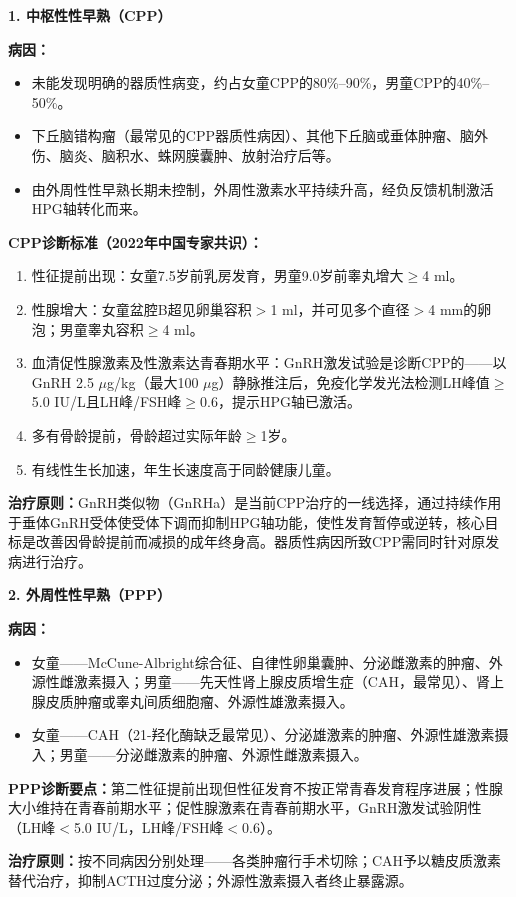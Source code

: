\begin{keybox}
\textbf{1. 中枢性性早熟（CPP）}

\textbf{病因：}
\begin{itemize}[leftmargin=*]
    \item {}未能发现明确的器质性病变，约占女童CPP的80\%--90\%，男童CPP的40\%--50\%。
    \item {}下丘脑错构瘤（最常见的CPP器质性病因）、其他下丘脑或垂体肿瘤、脑外伤、脑炎、脑积水、蛛网膜囊肿、放射治疗后等。
    \item {}由外周性性早熟长期未控制，外周性激素水平持续升高，经负反馈机制激活HPG轴转化而来。
\end{itemize}

\textbf{CPP诊断标准（2022年中国专家共识）：}
\begin{enumerate}[leftmargin=*]
    \item 性征提前出现：女童7.5岁前乳房发育，男童9.0岁前睾丸增大$\geq$4 ml。
    \item 性腺增大：女童盆腔B超见卵巢容积$>$1 ml，并可见多个直径$>$4 mm的卵泡；男童睾丸容积$\geq$4 ml。
    \item 血清促性腺激素及性激素达青春期水平：GnRH激发试验是诊断CPP的——以GnRH 2.5 $\mu$g/kg（最大100 $\mu$g）静脉推注后，免疫化学发光法检测LH峰值$\geq$5.0 IU/L且LH峰/FSH峰$\geq$0.6，提示HPG轴已激活。
    \item 多有骨龄提前，骨龄超过实际年龄$\geq$1岁。
    \item 有线性生长加速，年生长速度高于同龄健康儿童。
\end{enumerate}

\textbf{治疗原则：}GnRH类似物（GnRHa）是当前CPP治疗的一线选择，通过持续作用于垂体GnRH受体使受体下调而抑制HPG轴功能，使性发育暂停或逆转，核心目标是改善因骨龄提前而减损的成年终身高。器质性病因所致CPP需同时针对原发病进行治疗。

\vspace{6pt}

\textbf{2. 外周性性早熟（PPP）}

\textbf{病因：}
\begin{itemize}[leftmargin=*]
    \item {}女童——McCune-Albright综合征、自律性卵巢囊肿、分泌雌激素的肿瘤、外源性雌激素摄入；男童——先天性肾上腺皮质增生症（CAH，最常见）、肾上腺皮质肿瘤或睾丸间质细胞瘤、外源性雄激素摄入。
    \item {}女童——CAH（21-羟化酶缺乏最常见）、分泌雄激素的肿瘤、外源性雄激素摄入；男童——分泌雌激素的肿瘤、外源性雌激素摄入。
\end{itemize}

\textbf{PPP诊断要点：}第二性征提前出现但性征发育不按正常青春发育程序进展；性腺大小维持在青春前期水平；促性腺激素在青春前期水平，GnRH激发试验阴性（LH峰$<$5.0 IU/L，LH峰/FSH峰$<$0.6）。

\textbf{治疗原则：}按不同病因分别处理——各类肿瘤行手术切除；CAH予以糖皮质激素替代治疗，抑制ACTH过度分泌；外源性激素摄入者终止暴露源。
\end{keybox}

